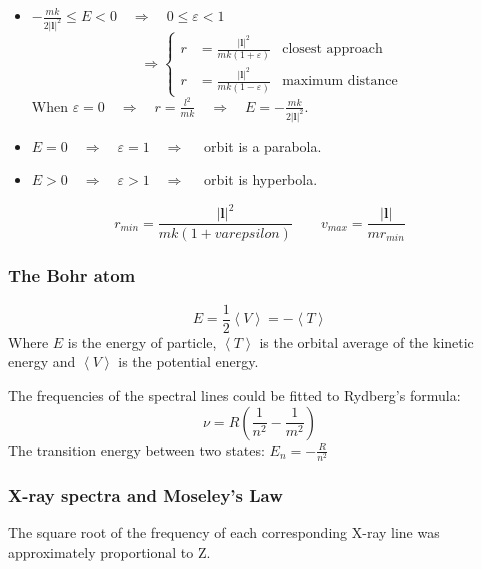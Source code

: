 \documentclass[a4paper,lang=cn,a4paper]{elegantpaper}
\newcommand{\vect}[1]{\boldsymbol{#1}}
\begin{document}
\begin{itemize}
    \item $-\frac{mk}{2|\vect{l}|^2}\leqslant E <0 \quad \Longrightarrow \quad 0\leqslant\varepsilon<1$
    \begin{equation*}
        \Longrightarrow \left\{
        \begin{aligned}
            r &= \frac{|\vect{l}|^2}{mk(1+\varepsilon)} &\text{closest approach}\\
            r &= \frac{|\vect{l}|^2}{mk(1-\varepsilon)} &\text{maximum distance}
        \end{aligned}\right.
    \end{equation*}
    When $\varepsilon = 0 \quad \Longrightarrow \quad r=\frac{l^2}{mk}\quad \Longrightarrow \quad E=-\frac{mk}{2|\vect{l}|^2}$.
    \item $E=0\quad \Longrightarrow \quad \varepsilon=1 \quad \Longrightarrow \quad$ orbit is a parabola.
    \item $E>0\quad \Longrightarrow \quad \varepsilon>1 \quad \Longrightarrow \quad$ orbit is hyperbola.
\end{itemize}
\begin{equation*}
    r_{min}=\frac{|\vect{l}|^2}{mk(1+varepsilon)} \qquad v_{max}=\frac{|\vect{l}|}{mr_{min}}
\end{equation*}

\subsubsection{The Bohr atom}
\begin{equation*}
    E = \frac{1}{2} \left\langle V\right\rangle = -\left\langle T\right\rangle
\end{equation*}
Where $E$ is the energy of particle, $\left\langle T \right\rangle$
is the orbital average of the kinetic energy and 
$\left\langle V\right\rangle$ is the potential energy.

The frequencies of the spectral lines could be fitted to Rydberg's 
formula: 
\begin{equation*}
    \nu = R\left(\frac{1}{n^2}-\frac{1}{m^2}\right)
\end{equation*}
The transition energy between two states: $E_n = -\frac{R}{n^2}$

\subsubsection{X-ray spectra and Moseley's Law}
The square root of the frequency of each corresponding X-ray line 
was approximately proportional to Z.
\end{document}
